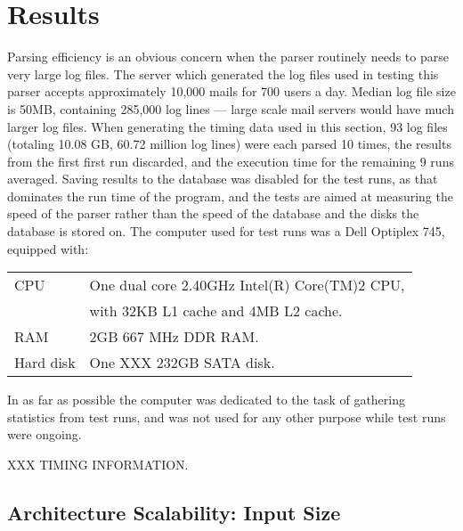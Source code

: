 \documentclass[draft]{svmult}
\newcommand{\numberOFlogFILES}[0]{%
    93%
}
\newcommand{\numberOFlogLINEShuman}[0]{%
    60.72 million%
}
\begin{document}
\section{Results}

Parsing efficiency is an obvious concern when the parser routinely needs to
parse very large log files.  The server which generated the log files used
in testing this parser accepts approximately 10,000 mails for 700 users a
day.  Median log file size is 50MB, containing 285,000 log lines --- large
scale mail servers would have much larger log files.  When generating the
timing data used in this section, \numberOFlogFILES{} log files (totaling
10.08 GB, \numberOFlogLINEShuman{} log lines) were each parsed 10 times,
the results from the first first run discarded, and the execution time for
the remaining 9 runs averaged.  Saving results to the database was disabled
for the test runs, as that dominates the run time of the program, and the
tests are aimed at measuring the speed of the parser rather than the speed
of the database and the disks the database is stored on.  The computer used
for test runs was a Dell Optiplex 745, equipped with: 

\begin{tabular}[]{ll}

CPU         & One dual core 2.40GHz Intel(R) Core(TM)2 CPU, \\
            & with 32KB L1 cache and 4MB L2 cache.          \\
RAM         & 2GB 667 MHz DDR RAM\@.                        \\
Hard disk   & One XXX 232GB SATA disk.                      \\

\end{tabular}

In as far as possible the computer was dedicated to the task of gathering
statistics from test runs, and was not used for any other purpose while
test runs were ongoing.

XXX TIMING INFORMATION\@.
\newpage

\subsection{Architecture Scalability: Input Size}
\end{document}
